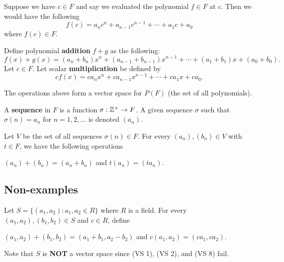 Suppose we have \( c \in F  \) and say we evaluated the polynomial \( f \in F   \) at \( c  \). Then we would have the following 
\[  f(c) = a_n c^{n} + a_{n-1} c^{n-1} + \cdots + a_{1}c + a_{0} \]
where \( f(c) \in F  \).

\begin{definition}
    Define polynomial \textbf{addition} \( f + g  \) as the following:
        \[  f(x) + g(x) = (a_{n} + b_{n} ) x^{n} + (a_{n-1} + b_{n-1}) x^{n-1} + \cdots + (a_{1} + b_{1})x + (a_{0} + b_{0}). \] Let \( c \in F  \). Let scalar \textbf{multiplication} be defined by 
        \[  c f(x) = ca_n x^{n} + ca_{n-1} x^{n-1} + \cdots + ca_{1}x + ca_{0}. \]
\end{definition}

The operations above form a vector space for \( P(F) \) (the set of all polynomials).

\begin{definition}[Sequences]
    A \textbf{sequence} in \( F  \) is a function \( \sigma : \mathbb{Z}^{+} \to F   \). A given sequence \( \sigma  \) such that \( \sigma (n) = a_{n}  \) for \( n = 1,2,\dots  \) is denoted \( (a_{n}) \).   
\end{definition}

Let \( V  \) be the set of all sequences \( \sigma(n) \in F  \). For every \( (a_{n}), (b_{n} ) \in V  \) with \( t \in F  \), we have the following operations
\begin{center}
        \( (a_{n}) + (b_{n}) = (a_{n} + b_{n}) \) and \( t(a_{n}) = (t a_{n}) \).
\end{center}

\subsection{Non-examples}

\begin{eg}
    Let \( S = \{  (a_{1}, a_{2}) : a_{1} , a_{2} \in R  \}   \) where \( R  \) is a field. For every \( (a_{1} , a_{2}), (b_{1} , b_{2} ) \in S  \) and \( c \in R  \), define 
    \begin{center}
        \( (a_{1}, a_{2} ) + (b_{1}, b_{2}) = (a_{1} + b_{1} , a_{2} - b_{2}) \) and \( c(a_{1}, a_{2}) = (ca_{1}  , ca_{2}) \). 
    \end{center}
    Note that \( S \) is \textbf{NOT} a vector space since  (VS 1), (VS 2), and (VS 8) fail. 
\end{eg}



